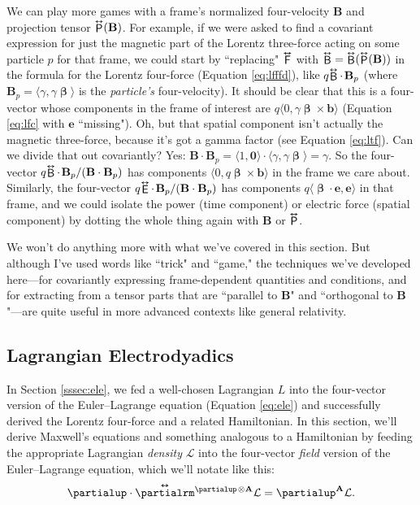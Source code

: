 \documentclass[12pt]{article}
\renewcommand{\vv}[1]{\mathbf{#1}}
\newcommand{\vvbeta}{\bm{\upbeta}}
\newcommand{\tightoverset}[2]{%
  \mathop{#2}\limits^{\vbox to -.5ex{\kern-0.75ex\hbox{$#1$}\vss}}}
\newcommand{\inlinedy}[1]{\tightoverset{\text{\tiny$\bm\leftrightarrow$}}{#1}}
\newcommand{\capdy}[1]{ \overset{ \text{\tiny$\bm\leftrightarrow$} }{\vphantom{\text{\small{A}}}\smash{#1}} }
\begin{document}
We can play more games with a frame's normalized four-velocity $\vv B$ and projection tensor $\inlinedy{\mathsf{P}} (\vv B)$. For example, if we were asked to find a covariant expression for just the magnetic part of the Lorentz three-force acting on some particle $p$ for that frame, we could start by ``replacing" $\inlinedy{\mathsf{F}}$ with ${\inlinedy{\mathsf{B}} = \inlinedy{\mathsf{B}} (\inlinedy{\mathsf{P}} (\vv B))}$ in the formula for the Lorentz four-force (Equation \ref{eq:lfffd}), like $q \mkern-2.5mu \inlinedy{\mathsf{B}} \cdot \mkern2mu \vv B_p$ (where ${\vv B_p = \langle \gamma, \gamma \vvbeta \rangle}$ is the \emph{particle's} four-velocity). It should be clear that this is a four-vector whose components in the frame of interest are ${q \langle 0, \gamma \vvbeta \times \vv b \rangle}$ (Equation \ref{eq:lfc} with $\vv e$ ``missing"). Oh, but that spatial component isn't actually the magnetic three-force, because it's got a gamma factor (see Equation \ref{eq:ltf}). Can we divide that out covariantly? Yes: ${{\vv B \cdot \vv B_p = \langle 1, \vv 0 \rangle \cdot \langle \gamma, \gamma \vvbeta \rangle = \gamma}}$. So the four-vector ${q \mkern-2.5mu \inlinedy{\mathsf{B}} \cdot \mkern2mu \vv B_p / (\vv B \cdot \vv B_p)}$ has components ${\langle 0, q \vvbeta \times \vv b \rangle}$ in the frame we care about. Similarly, the four-vector ${q \mkern-2.5mu \inlinedy{\mathsf{E}} \cdot \mkern2mu \vv B_p / (\vv B \cdot \vv B_p)}$ has components $q {\langle \vvbeta \cdot \vv e, \vv e \rangle}$ in that frame, and we could isolate the power (time component) or electric force (spatial component) by dotting the whole thing again with $\vv B$ or $\inlinedy{\mathsf{P}}$.

We won't do anything more with what we've covered in this section. But although I've used words like ``trick" and ``game," the techniques we've developed here---for covariantly expressing frame-dependent quantities and conditions, and for extracting from a tensor parts that are ``parallel to $\vv B$" and ``orthogonal to $\vv B$"---are quite useful in more advanced contexts like general relativity.

\subsection{Lagrangian Electrodyadics}

In Section \ref{sssec:ele}, we fed a well-chosen Lagrangian $L$ into the four-vector version of the Euler--Lagrange equation (Equation \ref{eq:ele}) and successfully derived the Lorentz four-force and a related Hamiltonian. In this section, we'll derive Maxwell's equations and something analogous to a Hamiltonian by feeding the appropriate Lagrangian \emph{density} $\mathcal{L}$ into the four-vector \emph{field} version of the Euler--Lagrange equation, which we'll notate like this:
\begin{equation}\label{eq:elef}
\partialup \cdot \capdy{\partialrm} {}^{\partialup \mkern2mu \otimes \vv A} \mathcal{L} = \partialup^{\vv A} \mathcal{L} .
\end{equation}
\end{document}
